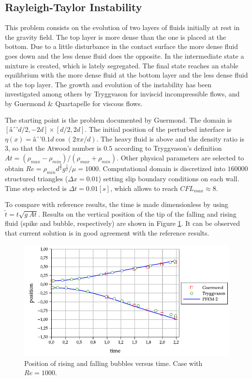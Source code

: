 \subsection{Rayleigh-Taylor Instability}

This problem consists on the evolution of two layers of fluids initially at rest in the gravity field. The top layer is more dense than the one is placed at the bottom. Due to a little disturbance in the contact surface the more dense fluid goes down and the less dense fluid does the opposite. In the intermediate state a mixture is created, which is lately segregated. The final state reaches an stable equilibrium with the more dense fluid at the bottom layer and the less dense fluid at the top layer. The growth and evolution of the instability has been investigated among others by Tryggvason\cite{Tryggvason88} for inviscid incompressible flows, and by Guermond
\& Quartapelle\cite{Guermond00} for viscous flows.

The starting point is the problem documented by Guermond. The domain is $[âd/2,-2d]\times[d/2,2d]$. The initial position of the perturbed interface is $\eta(x) = â0.1d \cos(2\pi x/d)$. The heavy fluid is above and the density ratio is $3$, so that the Atwood
number is $0.5$ according to Tryggvason's definition $At = (\rho_{max}-\rho_{min})/(\rho_{max}+\rho_{min})$. Other physical parameters are selected to obtain $Re=\rho_{min}d^{\frac{3}{2}}g^{\frac{1}{2}}/\mu=1000$. Computational domain is discretized into $160000$ structured triangles ($\Delta x=0.01$) setting slip boundary conditions on each wall. Time step selected is $\Delta t=0.01[s]$, which allows to reach $CFL_{max} \approx 8$.

To compare with reference results, the time is made dimensionless by using $\widetilde{t} = t\sqrt{g\ At}$. Results on the vertical position of the tip of the falling and rising fluid (spike and bubble, respectively) are shown in Figure \ref{fg:rayleigh-rf}. It can be observed that current solution is in good agreement with the reference results.

\begin{figure}[H]
  \begin{center}
      \includegraphics[width=\columnwidth]{images/rayleigh_1.pdf}
  \end{center}
  \caption{\label{fg:rayleigh-rf} Position of rising and falling bubbles versus time. Case with $Re=1000$.}
\end{figure}

